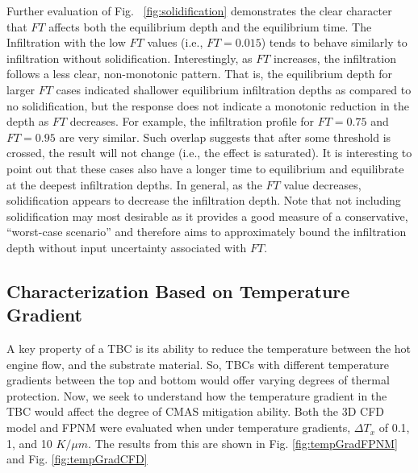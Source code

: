 \documentclass{UCF_ETD}
\begin{document}
Further evaluation of Fig. ~\ref{fig:solidification} demonstrates the clear character that $FT$ affects both the equilibrium depth and the equilibrium time. 
The Infiltration with the low $FT$ values (i.e., $FT=0.015$) tends to behave similarly to infiltration without solidification. 
Interestingly, as $FT$ increases, the infiltration follows a less clear, non-monotonic pattern. 
That is, the equilibrium depth for larger $FT$ cases indicated 
shallower equilibrium infiltration depths as compared to no solidification, but the response does not indicate a monotonic reduction in the depth as $FT$ decreases. 
For example, the infiltration profile for $FT=0.75$ and $FT=0.95$ are very similar.
Such overlap suggests that after some threshold is crossed, the result will not change (i.e., the effect is saturated). 
It is interesting to point out that these cases also have a longer time to equilibrium and equilibrate at the deepest infiltration depths. 
In general, as the $FT$ value decreases, solidification appears to decrease the infiltration depth. 
Note that not including solidification may most desirable as it provides a good measure of a conservative, ``worst-case scenario'' and therefore aims to approximately bound the infiltration depth without input uncertainty associated with $FT$.

 \subsection{Characterization Based on Temperature Gradient}

A key property of a TBC is its ability to reduce the temperature between the hot engine flow, and the substrate material. So, TBCs with different temperature gradients between the top and bottom would offer varying degrees of thermal protection. Now, we seek to understand how the temperature gradient in the TBC would affect the degree of CMAS mitigation ability. Both the 3D CFD model and FPNM were evaluated when under temperature gradients, $\Delta T_{x}$ of 0.1, 1, and 10 $K/\mu m$. The results from this are shown in Fig. \ref{fig:tempGradFPNM} and Fig. \ref{fig:tempGradCFD}
\end{document}
